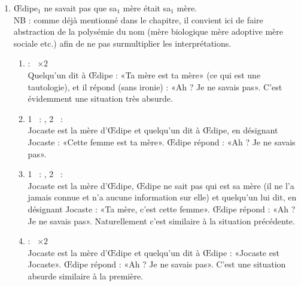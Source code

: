 \begin{exo}
\begin{solu}
\begin{enumerate}
\item \OE dipe$_1$ ne {savait} pas que {sa$_1$ mère} était {sa$_1$ mère}.
\\
NB : comme déjà mentionné dans le chapitre, il convient ici de faire abstraction de la polysémie du nom  (mère biologique {\vs} mère adoptive {\vs} mère sociale etc.) afin de ne pas surmultiplier les interprétations.

\begin{enumerate}
\item  {} : \dedicto\ $\times 2$\\
Quelqu'un dit à \OE dipe : «Ta mère est ta mère» (ce qui est une tautologie), et il répond (sans ironie)  : «Ah ? Je ne savais pas».  C'est évidemment une situation très absurde.

\item 1\ier\  : \dere, 2\ieme\  : \dedicto\\
Jocaste est la mère d'\OE dipe et quelqu'un dit à \OE dipe, en désignant Jocaste : «Cette femme est ta mère».  \OE dipe répond : «Ah ? Je ne savais pas».

\item 1\ier\  : \dedicto, 2\ieme\  : \dere\\
Jocaste est la mère d'\OE dipe, \OE dipe ne sait pas qui est sa mère (il ne l'a jamais connue et n'a aucune information sur elle) et quelqu'un lui dit, en désignant Jocaste : «Ta mère, c'est cette femme».  \OE dipe répond : «Ah ? Je ne savais pas».  Naturellement c'est similaire à la situation précédente.

\item  {} : \dere\ $\times 2$\\
Jocaste est la mère d'\OE dipe et quelqu'un dit à \OE dipe : «Jocaste est Jocaste».   \OE dipe répond : «Ah ? Je ne savais pas».  C'est une situation absurde similaire à la première.

\end{enumerate}

\end{enumerate}
\end{solu}
\end{exo}
